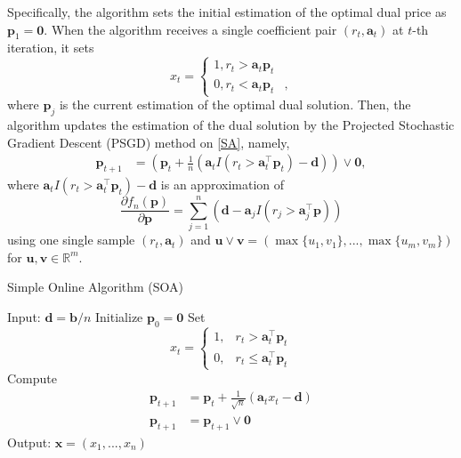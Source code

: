 \documentclass{article} %
\begin{document}
Specifically, the algorithm sets the initial estimation of the optimal dual price as $\bm{p}_1=\bm{0}$. When the algorithm receives a single coefficient pair $(r_t,\bm{a}_t)$ at $t$-th iteration, it  sets
\begin{equation}
\label{SOA_dec_Alg}
    x_t
    =
    \left\{
    \begin{matrix}
    1, r_t>\bm{a}_t\bm{p}_t& \\
    0,  r_t<\bm{a}_t\bm{p}_t&,
    \end{matrix}
    \right.
\end{equation}
where $\bm{p}_j$ is the current estimation of the optimal dual solution. Then, the algorithm updates the estimation of the dual solution by the Projected Stochastic Gradient Descent (PSGD) method on \eqref{SA},  namely, 
\begin{align*}
        \bm{p}_{t+1} &= \left(\bm{p}_t + \frac{1}{n}\left(\bm{a}_tI(r_t>\bm{a}_t^\top \bm{p}_t)-\bm{d}\right)\right)\vee \bm{0},
\end{align*}
where $\bm{a}_tI(r_t>\bm{a}^\top_t \bm{p}_t)-\bm{d}$ is an approximation of 
\begin{equation*}
   \frac{ \partial f_n(\bm{p}) }{\partial \bm{p}}
    =
    \sum_{j=1}^{n}\left(\bm{d}-\bm{a}_jI(r_j>\bm{a}_j^\top \bm{p})\right)
\end{equation*}
using one single sample $(r_t,\bm{a}_t)$ and $\bm{u}\vee \bm{v}=\left(\max\{u_1,v_1\},...,\max\{u_m,v_m\}\right)$ for $\bm{u},\bm{v}\in\mathbb{R}^{m}$. 



\begin{algorithm}[ht!]
\caption{Simple Online Algorithm (SOA)}
\label{alg:SOA}
\begin{algorithmic}[1]
\State Input: $\bm{d}=\bm{b}/n$
\State Initialize $\bm{p}_0 = \bm{0}$ 
\State Set 
$$x_t = \begin{cases}
1,& r_t >\bm{a}_t^\top \bm{p}_t \\
0,& r_t \le \bm{a}_t^\top \bm{p}_t 
\end{cases}$$
\State Compute
\begin{align*}
    \bm{p}_{t+1} & = \bm{p}_t + \frac{1}{\sqrt{n}} \left(\bm{a}_tx_t - \bm{d}\right) \\
    \bm{p}_{t+1} & = \bm{p}_{t+1} \vee \bm{0}
\end{align*}
\EndFor
\State Output: $\bm{x} = (x_1,...,x_n)$
\end{algorithmic}
\end{algorithm}
\end{document}
